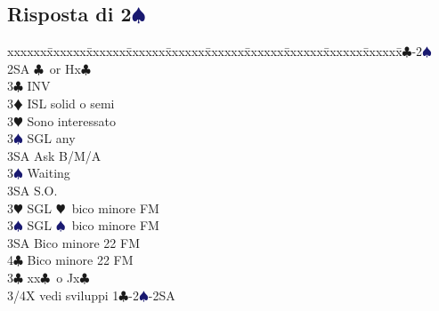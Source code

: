 \documentclass[a4paper,italian]{article}
\newcommand{\BC}{\textcolor{OliveGreen}{$\clubsuit$}}
\newcommand{\BD}{\textcolor{RedOrange}{$\vardiamondsuit$}}
\newcommand{\BH}{\textcolor{Red2}{$\varheartsuit${}}}
\newcommand{\BS}{\textcolor{MidnightBlue}{$\spadesuit${}}}
\newcommand{\pdfs}{\texorpdfstring{\BS{}}{S}}
\newenvironment{bidtable}
{\begin{tabbing}

    xxxxxx\=xxxxxx\=xxxxxx\=xxxxxx\=xxxxxx\=xxxxxx\=xxxxxx\=xxxxxx\=xxxxxx\=xxxxxx\=\kill}
{\end{tabbing} }%
\begin{document}
                                \begin{minipage}[t]{.493\textwidth}
                                    \subsection{Risposta di 2\pdfs}

                                    \begin{bidtable}
                                        1\BC-2\BS\+\\
                                        2SA \BC\ or Hx\BC \+\\
                                        3\BC \> INV\\
                                        3\BD \> ISL solid o semi\+\\
                                        3\BH \> Sono interessato\+\\
                                        3\BS \> SGL any\+\\
                                        3SA \> Ask B/M/A\-\-\\
                                        3\BS \> Waiting\\
                                        3SA \> S.O.\-\\
                                        3\BH \> SGL \BH\ bico minore FM\\
                                        3\BS \> SGL \BS\ bico minore FM\\
                                        3SA \> Bico minore 22 FM\\
                                        4\BC \> Bico minore 22 FM\-\\
                                        3\BC \> xx\BC\ o Jx\BC \+\\
                                        3/4X \> vedi sviluppi 1\BC -2\BS -2SA\-\-
                                    \end{bidtable}
                                \end{minipage}
                                {
                                    {\vrule width 1pt}
                                    }
                                    \newpage
\end{document}
